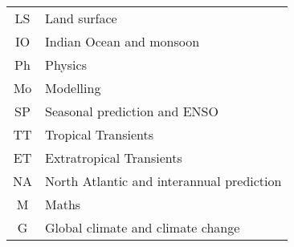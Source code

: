 \documentclass{article}
\begin{document}
\begin{tabular}{cl}
LS & Land surface \\
IO & Indian Ocean and monsoon \\
Ph & Physics \\
Mo & Modelling \\
SP & Seasonal prediction and ENSO \\
TT & Tropical Transients \\
ET & Extratropical Transients \\
NA & North Atlantic and interannual prediction \\
M  & Maths \\
G & Global climate and climate change \\
\end{tabular}



\nocite{*}
\end{document}
